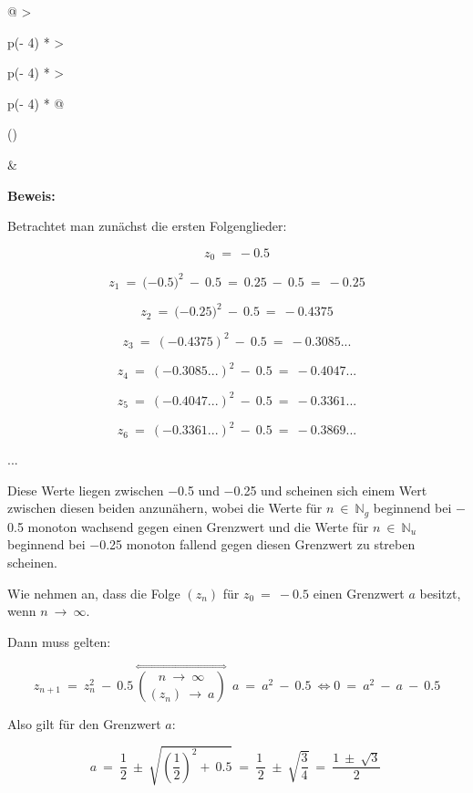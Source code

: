 \documentclass{book}
\begin{document}
\begin{longtable}[]{@{}
  >{\raggedright\arraybackslash}p{(\columnwidth - 4\tabcolsep) * }
  >{\raggedright\arraybackslash}p{(\columnwidth - 4\tabcolsep) * }
  >{\raggedright\arraybackslash}p{(\columnwidth - 4\tabcolsep) * }@{}}
\toprule()
\begin{minipage}[b]{\linewidth}\raggedright
\end{minipage} & \begin{minipage}[b]{\linewidth}\raggedright
\textbf{Beweis:}

Betrachtet man zunächst die ersten Folgenglieder:

\[z_{0}\  = \  - 0.5\]

\[z_{1}\  = \ ( - {0.5)}^{2}\  - \ 0.5\  = \ 0.25\  - \ 0.5\  = \  - 0.25\]

\[z_{2}\  = \ ( - {0.25)}^{2}\  - \ 0.5\  = \  - 0.4375\]

\[z_{3}\  = \ {( - 0.4375)}^{2}\  - \ 0.5\  = \  - 0.3085...\]

\[z_{4}\  = \ {( - 0.3085...)}^{2}\  - \ 0.5\  = \  - 0.4047...\]

\[z_{5}\  = \ {( - 0.4047...)}^{2}\  - \ 0.5\  = \  - 0.3361...\]

\[z_{6}\  = \ {( - 0.3361...)}^{2}\  - \ 0.5\  = \  - 0.3869...\]

...

Diese Werte liegen zwischen \(-\)0.5 und \(-\)0.25 und scheinen sich
einem Wert zwischen diesen beiden anzunähern, wobei die Werte für
\(n\  \in \ \mathbb{N}_{g}\) beginnend bei \(-\)0.5 monoton wachsend
gegen einen Grenzwert und die Werte für \(n\  \in \ \mathbb{N}_{u}\)
beginnend bei \(-\)0.25 monoton fallend gegen diesen Grenzwert zu
streben scheinen.

Wie nehmen an, dass die Folge \(\left( z_{n} \right)\) für
\(z_{0}\  = \  - 0.5\) einen Grenzwert \(a\) besitzt, wenn
\(n\  \rightarrow \ \infty\).

Dann muss gelten:

\[z_{n + 1}\  = \ z_{n}^{2}\  - \ 0.5\ \overset{\Leftrightarrow}{\binom{n\  \rightarrow \ \infty}{\left( z_{n} \right)\  \rightarrow \ a}}\ \ a\  = \ a^{2}\  - \ 0.5\  \Longleftrightarrow 0\  = \ a^{2}\  - \ a\  - \ 0.5\]

Also gilt für den Grenzwert \(a\):

\[a\  = \ \frac{1}{2}\  \pm \ \sqrt{\left( \frac{1}{2} \right)^{2} + \ 0.5}\  = \ \frac{1\ }{2}\  \pm \ \sqrt{\frac{3}{4}}\  = \ \frac{1\  \pm \ \sqrt{3}}{2}\ \]


\end{minipage}
\end{longtable}
\end{document}
